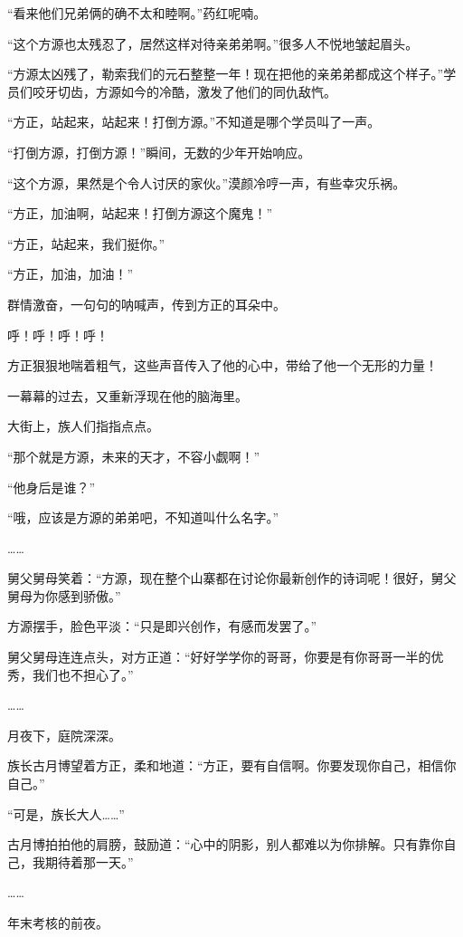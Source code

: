 
\begin{this_body}

“看来他们兄弟俩的确不太和睦啊。”药红呢喃。

“这个方源也太残忍了，居然这样对待亲弟弟啊。”很多人不悦地皱起眉头。

“方源太凶残了，勒索我们的元石整整一年！现在把他的亲弟弟都成这个样子。”学员们咬牙切齿，方源如今的冷酷，激发了他们的同仇敌忾。

“方正，站起来，站起来！打倒方源。”不知道是哪个学员叫了一声。

“打倒方源，打倒方源！”瞬间，无数的少年开始响应。

“这个方源，果然是个令人讨厌的家伙。”漠颜冷哼一声，有些幸灾乐祸。

“方正，加油啊，站起来！打倒方源这个魔鬼！”

“方正，站起来，我们挺你。”

“方正，加油，加油！”

群情激奋，一句句的呐喊声，传到方正的耳朵中。

呼！呼！呼！呼！

方正狠狠地喘着粗气，这些声音传入了他的心中，带给了他一个无形的力量！

一幕幕的过去，又重新浮现在他的脑海里。

大街上，族人们指指点点。

“那个就是方源，未来的天才，不容小觑啊！”

“他身后是谁？”

“哦，应该是方源的弟弟吧，不知道叫什么名字。”

……

舅父舅母笑着：“方源，现在整个山寨都在讨论你最新创作的诗词呢！很好，舅父舅母为你感到骄傲。”

方源摆手，脸色平淡：“只是即兴创作，有感而发罢了。”

舅父舅母连连点头，对方正道：“好好学学你的哥哥，你要是有你哥哥一半的优秀，我们也不担心了。”

……

月夜下，庭院深深。

族长古月博望着方正，柔和地道：“方正，要有自信啊。你要发现你自己，相信你自己。”

“可是，族长大人……”

古月博拍拍他的肩膀，鼓励道：“心中的阴影，别人都难以为你排解。只有靠你自己，我期待着那一天。”

……

年末考核的前夜。


\end{this_body}
